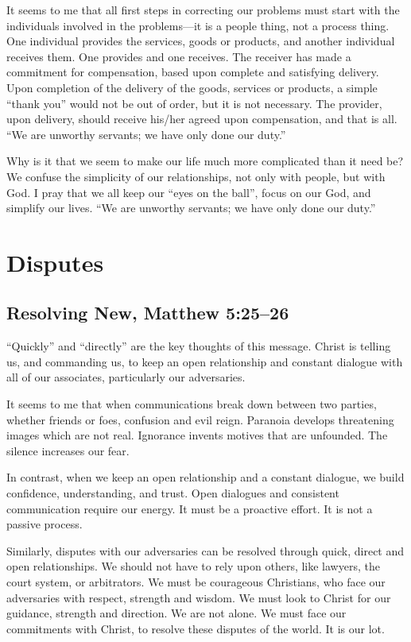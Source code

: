 \documentclass[12pt]{memoir}
\begin{document}
It seems to me that all first steps in correcting our problems must
start with the individuals involved in the problems---it is a people
thing, not a process thing. One individual provides the services,
goods or products, and another individual receives them. One provides
and one receives. The receiver has made a commitment for compensation,
based upon complete and satisfying delivery. Upon completion of the
delivery of the goods, services or products, a simple ``thank you''
would not be out of order, but it is not necessary. The provider,
upon delivery, should receive his\slash{}her agreed upon compensation, and
that is all. ``We are unworthy servants; we have only done our duty.''

Why is it that we seem to make our life much more complicated than
it need be? We confuse the simplicity of our relationships, not only
with people, but with God. I pray that we all keep our ``eyes on
the ball'', focus on our God, and simplify our lives. ``We are unworthy
servants; we have only done our duty.''

\section{Disputes}


\subsection[Resolving New]{Resolving New, Matthew 5:25--26}

``Quickly'' and ``directly'' are the key thoughts of this message.
Christ is telling us, and commanding us, to keep an open relationship
and constant dialogue with all of our associates, particularly our
adversaries.

It seems to me that when communications break down between two parties,
whether friends or foes, confusion and evil reign. Paranoia develops
threatening images which are not real. Ignorance invents motives that
are unfounded. The silence increases our fear. 

In contrast, when we keep an open relationship and a constant dialogue,
we build confidence, understanding, and trust. Open dialogues and
consistent communication require our energy. It must be a proactive
effort. It is not a passive process. 

Similarly, disputes with our adversaries can be resolved through quick,
direct and open relationships. We should not have to rely upon others,
like lawyers, the court system, or arbitrators. We must be courageous
Christians, who face our adversaries with respect, strength and wisdom.
We must look to Christ for our guidance, strength and direction. We
are not alone. We must face our commitments with Christ, to resolve
these disputes of the world. It is our lot.
\end{document}
